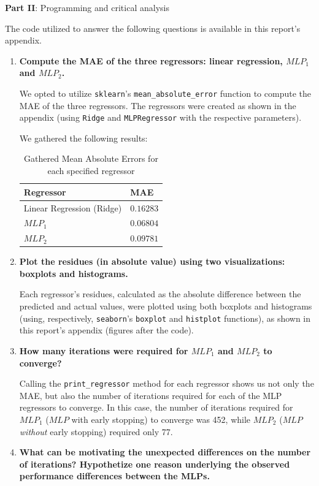 \documentclass[12pt]{article}
\begin{document}
\pagebreak

\center\large{\textbf{Part II}: Programming and critical analysis}

\begin{justify}
  The code utilized to answer the following questions is available in this
  report's appendix.
\end{justify}

\begin{enumerate}[leftmargin=\labelsep,resume]
  \item \textbf{Compute the MAE of the three regressors: linear regression, $MLP_1$ and $MLP_2$.}

        We opted to utilize \texttt{sklearn}'s \texttt{mean\_absolute\_error} function to compute the MAE of the three regressors.
        The regressors were created as shown in the appendix (using \texttt{Ridge} and
        \texttt{MLPRegressor} with the respective parameters).

        We gathered the following results:

        \begin{table}[h]
          \centering
          \begin{tabular}{l|l}
            Regressor                 & MAE       \\ \hline
            Linear Regression (Ridge) & $0.16283$ \\
            $MLP_1$                   & $0.06804$ \\
            $MLP_2$                   & $0.09781$
          \end{tabular}
          \caption{Gathered Mean Absolute Errors for each specified regressor}
          \label{tab:mean-absolute-errors}
        \end{table}

  \item \textbf{Plot the residues (in absolute value) using two visualizations: boxplots and histograms.}

        Each regressor's residues, calculated as the absolute difference between
        the predicted and actual values, were plotted using both boxplots and histograms
        (using, respectively, \texttt{seaborn}'s \texttt{boxplot} and \texttt{histplot} functions),
        as shown in this report's appendix (figures after the code).

  \item \textbf{How many iterations were required for $MLP_1$ and $MLP_2$ to converge?}

        Calling the \texttt{print\_regressor} method for each regressor shows us
        not only the MAE, but also the number of iterations required for each of
        the MLP regressors to converge. In this case, the number of iterations
        required for $MLP_1$ ($MLP$ with early stopping) to converge was 452,
        while $MLP_2$ ($MLP$ \textit{without} early stopping) required only 77.

  \item \textbf{What can be motivating the unexpected differences on the number of iterations?
          Hypothetize one reason underlying the observed performance differences between the MLPs.}
\end{enumerate}
\end{document}
